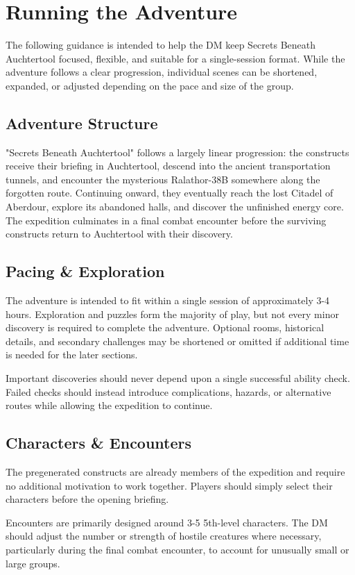 \section*{\LARGE Running the Adventure}
{\entryfont The following guidance is intended to help the DM keep Secrets Beneath Auchtertool focused, flexible, and suitable for a single-session format. While the adventure follows a clear progression, individual scenes can be shortened, expanded, or adjusted depending on the pace and size of the group.}
\subsection*{Adventure Structure}
{\entryfont "Secrets Beneath Auchtertool" follows a largely linear progression: the constructs receive their briefing in Auchtertool, descend into the ancient transportation tunnels, and encounter the mysterious Ralathor-38B somewhere along the forgotten route. Continuing onward, they eventually reach the lost Citadel of Aberdour, explore its abandoned halls, and discover the unfinished energy core. The expedition culminates in a final combat encounter before the surviving constructs return to Auchtertool with their discovery.}
\subsection*{Pacing \& Exploration}
{\entryfont The adventure is intended to fit within a single session of approximately 3-4 hours. Exploration and puzzles form the majority of play, but not every minor discovery is required to complete the adventure. Optional rooms, historical details, and secondary challenges may be shortened or omitted if additional time is needed for the later sections.

Important discoveries should never depend upon a single successful ability check. Failed checks should instead introduce complications, hazards, or alternative routes while allowing the expedition to continue.}
\subsection*{Characters \& Encounters}
{\entryfont The pregenerated constructs are already members of the expedition and require no additional motivation to work together. Players should simply select their characters before the opening briefing.

Encounters are primarily designed around 3-5 5th-level characters. The DM should adjust the number or strength of hostile creatures where necessary, particularly during the final combat encounter, to account for unusually small or large groups.}